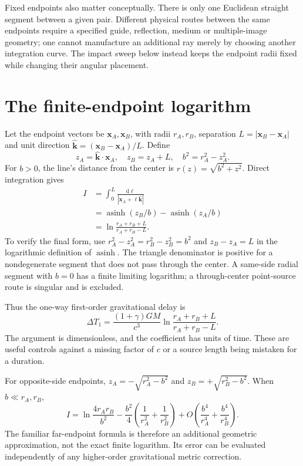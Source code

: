 \documentclass[10pt,twocolumn,letterpaper]{article}
\newcommand{\dd}{\mathrm{d}}
\begin{document}
Fixed endpoints also matter conceptually. There is only one Euclidean straight segment between a given pair. Different physical routes between the same endpoints require a specified guide, reflection, medium or multiple-image geometry; one cannot manufacture an additional ray merely by choosing another integration curve. The impact sweep below instead keeps the endpoint radii fixed while changing their angular placement.


\section{The finite-endpoint logarithm}
Let the endpoint vectors be $\mathbf x_A,\mathbf x_B$, with radii $r_A,r_B$, separation $L=|\mathbf x_B-\mathbf x_A|$ and unit direction $\widehat{\mathbf k}=(\mathbf x_B-\mathbf x_A)/L$. Define
\[
 z_A=\widehat{\mathbf k}\cdot\mathbf x_A,\quad z_B=z_A+L,
 \quad b^2=r_A^2-z_A^2.
\]
For $b>0$, the line's distance from the center is $r(z)=\sqrt{b^2+z^2}$. Direct integration gives
\[
\begin{aligned}
 I&=\int_0^L\frac{\dd\ell}{|\mathbf x_A+\ell\widehat{\mathbf k}|}\\
 &=\operatorname{asinh}(z_B/b)-\operatorname{asinh}(z_A/b)\\
 &=\ln\frac{r_A+r_B+L}{r_A+r_B-L}.
\end{aligned}
\]
To verify the final form, use $r_A^2-z_A^2=r_B^2-z_B^2=b^2$ and $z_B-z_A=L$ in the logarithmic definition of $\operatorname{asinh}$. The triangle denominator is positive for a nondegenerate segment that does not pass through the center. A same-side radial segment with $b=0$ has a finite limiting logarithm; a through-center point-source route is singular and is excluded.

Thus the one-way first-order gravitational delay is
\begin{equation}
 \Delta T_1=\frac{(1+\gamma)GM}{c^3}
 \ln\frac{r_A+r_B+L}{r_A+r_B-L}.
 \label{eq:finite-road}
\end{equation}
The argument is dimensionless, and the coefficient has units of time. These are useful controls against a missing factor of $c$ or a source length being mistaken for a duration.

For opposite-side endpoints, $z_A=-\sqrt{r_A^2-b^2}$ and $z_B=+\sqrt{r_B^2-b^2}$. When $b\ll r_A,r_B$,
\[
 I=\ln\frac{4r_Ar_B}{b^2}
 -\frac{b^2}{4}\left(\frac 1{r_A^2}+\frac 1{r_B^2}\right)
 +O\!\left(\frac{b^4}{r_A^4}+\frac{b^4}{r_B^4}\right).
\]
The familiar far-endpoint formula is therefore an additional geometric approximation, not the exact finite logarithm. Its error can be evaluated independently of any higher-order gravitational metric correction.
\end{document}
